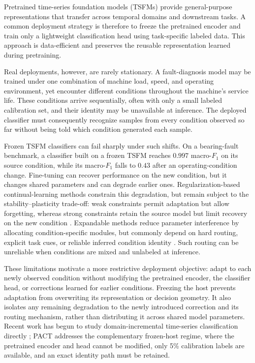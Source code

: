\documentclass[letterpaper]{article} %
\begin{document}
Pretrained time-series foundation models (TSFMs)
\citep{goswami_moment_2024,moirai,ansari_chronos_2024,pmlr-v267-liu25be,shi_time-moe_2025}
provide general-purpose representations that transfer across temporal
domains and downstream tasks. A common deployment strategy is therefore
to freeze the pretrained encoder and train only a lightweight
classification head using task-specific labeled data. This approach is
data-efficient and preserves the reusable representation learned during
pretraining.

Real deployments, however, are rarely stationary. A fault-diagnosis
model may be trained under one combination of machine load, speed, and
operating environment, yet encounter different conditions throughout
the machine's service life. These conditions arrive sequentially, often
with only a small labeled calibration set, and their identity may be
unavailable at inference. The deployed classifier must consequently
recognize samples from every condition observed so far without being
told which condition generated each sample.

Frozen TSFM classifiers can fail sharply under such shifts. On a
bearing-fault benchmark, a classifier built on a frozen TSFM reaches
$0.997$ macro-$F_1$ on its source condition, while its macro-$F_1$ falls
to $0.43$ after an operating-condition change. Fine-tuning can recover
performance on the new condition, but it changes shared parameters and
can degrade earlier ones. Regularization-based continual-learning methods
constrain this degradation, but remain
subject to the stability--plasticity trade-off: weak constraints permit
adaptation but allow forgetting, whereas strong constraints retain the
source model but limit recovery on the new condition
\citep{ewc,mas,si,lwf}. Expandable methods reduce parameter interference
by allocating condition-specific modules, but commonly depend on hard
routing, explicit task cues, or reliable inferred condition identity
\citep{sprompts}. Such routing can be unreliable when conditions are mixed
and unlabeled at inference.

These limitations motivate a more restrictive deployment objective:
adapt to each newly observed condition without modifying the pretrained
encoder, the classifier head, or corrections learned for earlier
conditions. Freezing the host prevents adaptation from overwriting its
representation or decision geometry. It also isolates any remaining
degradation to the newly introduced correction and its routing
mechanism, rather than distributing it across shared model parameters.
Recent work has begun to study domain-incremental time-series classification
directly \citep{dualcd}; PACT addresses the complementary frozen-host regime,
where the pretrained encoder and head cannot be modified, only 5\% calibration
labels are available, and an exact identity path must be retained.
\end{document}
